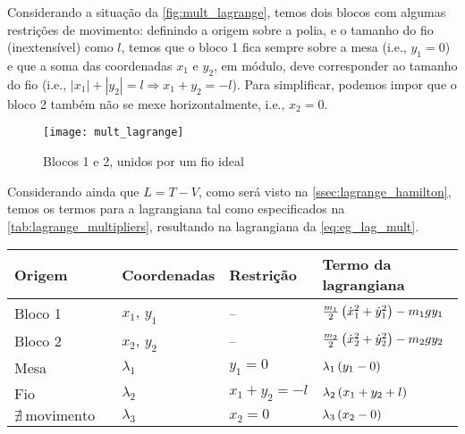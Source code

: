 \begin{eg}
    \FloatBarrier
    Considerando a situação da \autoref{fig:mult_lagrange}, temos dois blocos
    com algumas restrições de movimento: definindo a origem sobre a polia, e o
    tamanho do fio (inextensível) como $l$, temos que o bloco 1 fica sempre
    sobre a mesa (i.e., $y_1 = 0$) e que a soma das coordenadas $x_1$ e $y_2$,
    em módulo, deve corresponder ao tamanho do fio (i.e., $|x_1| + |y_2| = l
    \Rightarrow x_1 + y_2 = -l$). Para simplificar, podemos impor que o bloco 2
    também não se mexe horizontalmente, i.e., $x_2 = 0$.

    \begin{figure}[ht]
        \centering
        \texttt{[image: mult\_lagrange]}
        \caption{Blocos 1 e 2, unidos por um fio ideal}
        \label{fig:mult_lagrange}
    \end{figure}
    \FloatBarrier

    Considerando ainda que $L = T - V$, como será visto na
    \autoref{ssec:lagrange_hamilton}, temos os termos para a lagrangiana tal
    como especificados na \autoref{tab:lagrange_multipliers}, resultando na
    lagrangiana da \autoref{eq:eg_lag_mult}.

    \begin{table}[H]
        \centering
        \begin{tabularx}{\textwidth}{lllX}
            \toprule
            Origem & Coordenadas & Restrição & Termo da lagrangiana \\

            \midrule

            Bloco 1 & $x_1$, $y_1$ & -- & $\frac{m_1}{2} \del{{\dot x_1}^2 +
            {\dot y_1}^2} - m_1gy_1$ \\

            Bloco 2 & $x_2$, $y_2$ & -- & $\frac{m_2}{2} \del{{\dot x_2}^2 +
            {\dot y_2}^2} - m_2gy_2$ \\

            Mesa & $\lambda_1$ & $y_1 = 0$ &  $\lambda_1 \del{y_1 - 0}$ \\

            Fio & $\lambda_2$ & $x_1 + y_2 = -l$ & $\lambda_2 \del{x_1 + y_2 +
            l}$ \\

            $\nexists~\text{movimento horizontal}$ & $\lambda_3$ & $x_2 = 0$ &
            $\lambda_3 \del{x_2 - 0}$ \\


\end{tabularx}
\end{table}
\end{eg}
